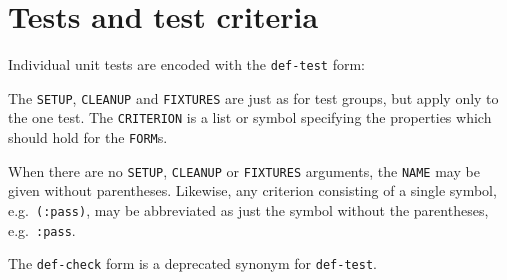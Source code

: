 
\section{Tests and test criteria}
Individual unit tests are encoded with the \texttt{def-test} form:

%
The \texttt{SETUP}, \texttt{CLEANUP} and \texttt{FIXTURES} are just as
for test groups, but apply only to the one test.  The
\texttt{CRITERION} is a list or symbol specifying the properties which
should hold for the \texttt{FORM}s.

When there are no \texttt{SETUP}, \texttt{CLEANUP} or
\texttt{FIXTURES} arguments, the \texttt{NAME} may be given without
parentheses.  Likewise, any criterion consisting of a single symbol,
e.g.\ \texttt{(:pass)}, may be abbreviated as just the symbol without
the parentheses, e.g.\ \texttt{:pass}.

The \texttt{def-check} form is a deprecated synonym for
\texttt{def-test}.

\def\criteriaGroup#1#2{\subsection{#1} #2}
\def\secText#1{#1}
\def\endcriteriaGroup{}
\def\criteriaDoc#1#2#3#4#5#6#7#8{%
\subsubsection{The \texttt{#2} criterion} 
#4\index{#1@\texttt{#2}}
\\ Syntax: \texttt{#3}
#7{#8}#6}
\def\noEx#1{}
\def\singleEx#1{\\Example: \texttt{#1}}
\def\multiEx#1{#1}
\def\passExample#1{\\Passing example: \texttt{#1}}
\def\failExample#1{\\Failing example: \texttt{#1}}
\def\tabbingEx#1{\\Example: \begin{tabbing}#1\end{tabbing}}
\def\noExpl{}
\def\hasExpl#1{\par#1}



